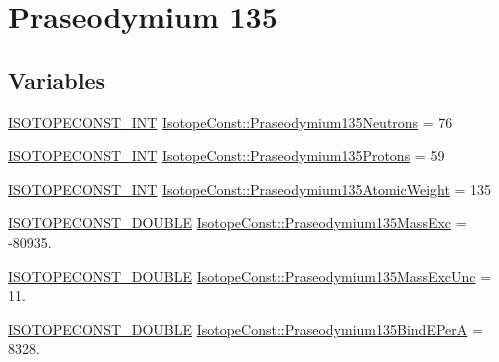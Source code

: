 \hypertarget{group___isotope_const-_praseodymium-_pr135}{}\section{Praseodymium 135}
\label{group___isotope_const-_praseodymium-_pr135}
\subsection*{Variables}
\begin{DoxyCompactItemize}
\item 
\mbox{\hyperlink{group___isotope_const-_macros_ga5f18360b3e99483a35c32d789e62621c}{I\+S\+O\+T\+O\+P\+E\+C\+O\+N\+S\+T\+\_\+\+I\+NT}} \mbox{\hyperlink{group___isotope_const-_praseodymium-_pr135_gaaab2082f9aaf2632ffb153889139a5ac}{Isotope\+Const\+::\+Praseodymium135\+Neutrons}} = 76
\item 
\mbox{\hyperlink{group___isotope_const-_macros_ga5f18360b3e99483a35c32d789e62621c}{I\+S\+O\+T\+O\+P\+E\+C\+O\+N\+S\+T\+\_\+\+I\+NT}} \mbox{\hyperlink{group___isotope_const-_praseodymium-_pr135_ga4e9ce1210ad302dc5587a84ba2635544}{Isotope\+Const\+::\+Praseodymium135\+Protons}} = 59
\item 
\mbox{\hyperlink{group___isotope_const-_macros_ga5f18360b3e99483a35c32d789e62621c}{I\+S\+O\+T\+O\+P\+E\+C\+O\+N\+S\+T\+\_\+\+I\+NT}} \mbox{\hyperlink{group___isotope_const-_praseodymium-_pr135_gaa08ec9a97139ab49e2299994e7f19a54}{Isotope\+Const\+::\+Praseodymium135\+Atomic\+Weight}} = 135
\item 
\mbox{\hyperlink{group___isotope_const-_macros_ga8f45a7272ce02c0b4c65c44636ed719a}{I\+S\+O\+T\+O\+P\+E\+C\+O\+N\+S\+T\+\_\+\+D\+O\+U\+B\+LE}} \mbox{\hyperlink{group___isotope_const-_praseodymium-_pr135_gaf7851f1181ec77d8a818aac385375c9f}{Isotope\+Const\+::\+Praseodymium135\+Mass\+Exc}} = -\/80935.
\item 
\mbox{\hyperlink{group___isotope_const-_macros_ga8f45a7272ce02c0b4c65c44636ed719a}{I\+S\+O\+T\+O\+P\+E\+C\+O\+N\+S\+T\+\_\+\+D\+O\+U\+B\+LE}} \mbox{\hyperlink{group___isotope_const-_praseodymium-_pr135_gab3f0aa2563da3f1379eb7eed853de396}{Isotope\+Const\+::\+Praseodymium135\+Mass\+Exc\+Unc}} = 11.
\item 
\mbox{\hyperlink{group___isotope_const-_macros_ga8f45a7272ce02c0b4c65c44636ed719a}{I\+S\+O\+T\+O\+P\+E\+C\+O\+N\+S\+T\+\_\+\+D\+O\+U\+B\+LE}} \mbox{\hyperlink{group___isotope_const-_praseodymium-_pr135_gaada2a76a185e801fd60b352692220d21}{Isotope\+Const\+::\+Praseodymium135\+Bind\+E\+PerA}} = 8328.

\end{DoxyCompactItemize}
